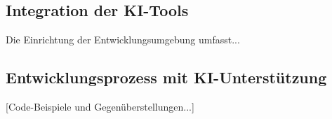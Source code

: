 \subsection{Integration der KI-Tools}
Die Einrichtung der Entwicklungsumgebung umfasst...

\subsection{Entwicklungsprozess mit KI-Unterstützung}
[Code-Beispiele und Gegenüberstellungen...] 